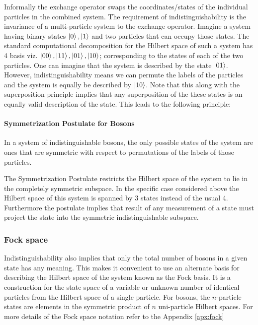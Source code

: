 \documentclass{article}
\begin{document}
Informally the exchange operator swaps the coordinates/states of the individual particles in the combined system.
The requirement of indistinguishability is the invariance of a multi-particle system to the exchange operator. 
Imagine a system having binary states $\ket{0},\ket{1}$ and two particles that can occupy those states. The standard computational decomposition for the Hilbert space of such a system has 4 basis viz. $\ket{00},\ket{11},\ket{01},\ket{10}$; corresponding to the states of each of the two particles. One can imagine that the system is described by the state $\ket{01}$. However, indistinguishability means we can permute the labels of the particles and the system is equally be described by $\ket{10}$. Note that this along with the superposition principle implies that any superposition of the these states is an equally valid description of the state. This leads to the following principle:

\paragraph{Symmetrization Postulate for Bosons} In a system of indistinguishable bosons, the only possible states of the system are ones that are symmetric with respect to permutations of the labels of those particles.

The Symmetrization Postulate restricts the Hilbert space of the system to lie in the completely symmetric subspace. In the specific case considered above the Hilbert space of this system is spanned by 3 states instead of the usual 4. Furthermore the postulate implies that result of any measurement of a state must project the state into the symmetric indistinguishable subspace.



\subsubsection{Fock space}
Indistinguishability also implies that only the total number of bosons in a given state has any meaning. This makes it convenient to use an alternate basis for describing the Hilbert space of the system known as the Fock basis. It is a construction for the state space of a variable or unknown number of identical particles from the Hilbert space of a single particle. For bosons, the $n$-particle states are elements in the symmetric product of $n$ uni-particle Hilbert spaces. For more details of the Fock space notation refer to the Appendix \ref{apx:fock}
\end{document}

